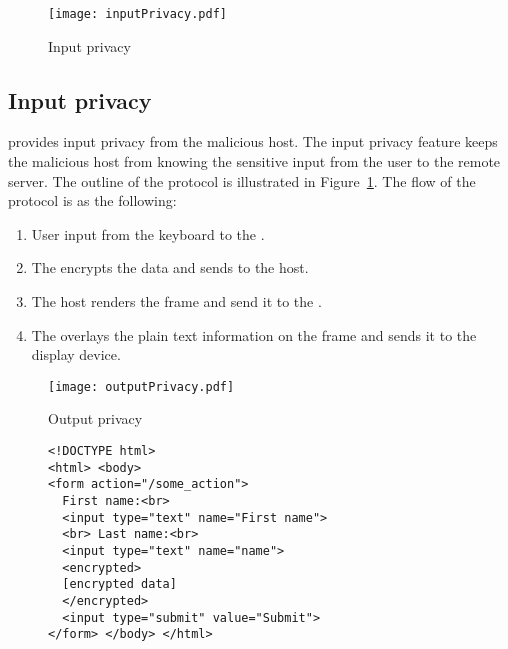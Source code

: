 \begin{figure}[h]
\centering
\texttt{[image: inputPrivacy.pdf]}
\caption{Input privacy}
\label{fig:inputPrivacy}
\centering
\end{figure}

\subsection{Input privacy}
\label{sec:systemnDesign:inputPrivacy}

\name provides input privacy from the malicious host. The input privacy feature keeps the malicious host from knowing the sensitive input from the user to the remote server. The outline of the protocol is illustrated in Figure~\ref{fig:inputPrivacy}. The flow of the protocol is as the following:

\begin{enumerate}
  \item[\one] User input from the keyboard to the \device.
  \item[\two] The \device encrypts the data and sends to the host.
  \item[\three] The host renders the frame and send it to the \device.
  \item[\four] The \device overlays the plain text information on the frame and sends it to the display device.
\end{enumerate}


\begin{figure}[h]
\centering
\texttt{[image: outputPrivacy.pdf]}
\caption{Output privacy}
\label{fig:outputPrivacy}
\centering
\end{figure}

\begin{figure}[t]
\small
\begin{lstlisting}[mathescape=true]
<!DOCTYPE html>
<html> <body>
<form action="/some_action">
  First name:<br>
  <input type="text" name="First name">
  <br> Last name:<br>
  <input type="text" name="name">
  <encrypted>
  [encrypted data]
  </encrypted>
  <input type="submit" value="Submit">
</form> </body> </html>
\end{lstlisting} 
\end{figure}


